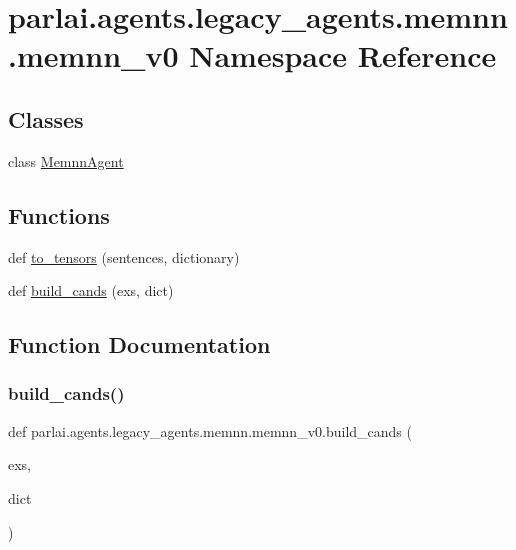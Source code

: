 \hypertarget{namespaceparlai_1_1agents_1_1legacy__agents_1_1memnn_1_1memnn__v0}{}\section{parlai.\+agents.\+legacy\+\_\+agents.\+memnn.\+memnn\+\_\+v0 Namespace Reference}
\label{namespaceparlai_1_1agents_1_1legacy__agents_1_1memnn_1_1memnn__v0}
\subsection*{Classes}
\begin{DoxyCompactItemize}
\item 
class \hyperlink{classparlai_1_1agents_1_1legacy__agents_1_1memnn_1_1memnn__v0_1_1MemnnAgent}{Memnn\+Agent}
\end{DoxyCompactItemize}
\subsection*{Functions}
\begin{DoxyCompactItemize}
\item 
def \hyperlink{namespaceparlai_1_1agents_1_1legacy__agents_1_1memnn_1_1memnn__v0_a8bf19c6993b40602c1d86a848b30c5a1}{to\+\_\+tensors} (sentences, dictionary)
\item 
def \hyperlink{namespaceparlai_1_1agents_1_1legacy__agents_1_1memnn_1_1memnn__v0_ab07fdb540c02e8e2a1cc7e8cf662a8b8}{build\+\_\+cands} (exs, dict)
\end{DoxyCompactItemize}


\subsection{Function Documentation}
\mbox{\label{namespaceparlai_1_1agents_1_1legacy__agents_1_1memnn_1_1memnn__v0_ab07fdb540c02e8e2a1cc7e8cf662a8b8}} 
\subsubsection{\texorpdfstring{build\+\_\+cands()}{build\_cands()}}
{\footnotesize\ttfamily def parlai.\+agents.\+legacy\+\_\+agents.\+memnn.\+memnn\+\_\+v0.\+build\+\_\+cands (\begin{DoxyParamCaption}\item[{}]{exs,  }\item[{}]{dict }\end{DoxyParamCaption})}



